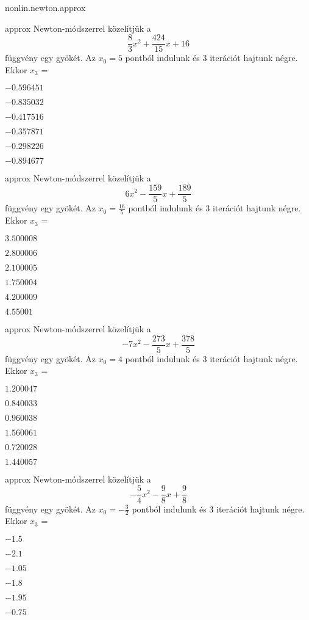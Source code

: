 \documentclass[12pt]{article}
\begin{document}
\begin{quiz}{nonlin.newton.approx}
\begin{multi}{approx}
Newton-módszerrel közelítjük a
$$\frac{8}{3}x^2+\frac{424}{15}x+16$$
függvény egy gyökét. Az $x_{0}=5$ pontból indulunk és $3$ iterációt hajtunk 
négre. Ekkor $x_{3}$ =
\item* $-0.596451$
\item  $-0.835032$
\item  $-0.417516$
\item  $-0.357871$
\item  $-0.298226$
\item  $-0.894677$
\end{multi}


\begin{multi}{approx}
Newton-módszerrel közelítjük a
$$6x^2-\frac{159}{5}x+\frac{189}{5}$$
függvény egy gyökét. Az $x_{0}=\frac{16}{5}$ pontból indulunk és $3$ iterációt hajtunk 
négre. Ekkor $x_{3}$ =
\item* $3.500008$
\item  $2.800006$
\item  $2.100005$
\item  $1.750004$
\item  $4.200009$
\item  $4.55001$
\end{multi}


\begin{multi}{approx}
Newton-módszerrel közelítjük a
$$-7x^2-\frac{273}{5}x+\frac{378}{5}$$
függvény egy gyökét. Az $x_{0}=4$ pontból indulunk és $3$ iterációt hajtunk 
négre. Ekkor $x_{3}$ =
\item* $1.200047$
\item  $0.840033$
\item  $0.960038$
\item  $1.560061$
\item  $0.720028$
\item  $1.440057$
\end{multi}


\begin{multi}{approx}
Newton-módszerrel közelítjük a
$$-\frac{5}{4}x^2-\frac{9}{8}x+\frac{9}{8}$$
függvény egy gyökét. Az $x_{0}=-\frac{3}{2}$ pontból indulunk és $3$ iterációt hajtunk 
négre. Ekkor $x_{3}$ =
\item* $-1.5$
\item  $-2.1$
\item  $-1.05$
\item  $-1.8$
\item  $-1.95$
\item  $-0.75$
\end{multi}



\end{quiz}
\end{document}
